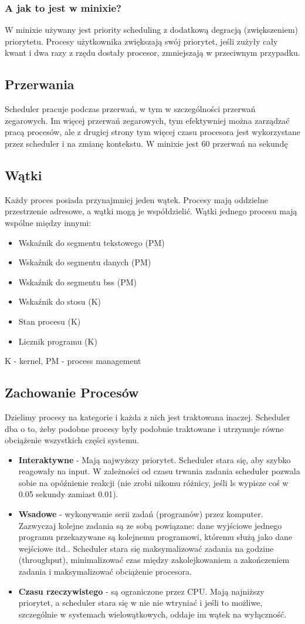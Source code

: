 \documentclass[12pt, a4paper, polish, openany]{book}
\begin{document}
\subsubsection{A jak to jest w minixie?}
W minixie używany jest priority scheduling z dodatkową degracją (zwiększeniem) priorytetu. Procesy użytkownika zwiększają swój priorytet, jeśli zużyły cały kwant i dwa razy z rzędu dostały procesor, zmniejszają w przeciwnym przypadku.
\subsection{Przerwania}
Scheduler pracuje podczas przerwań, w tym w szczególności przerwań zegarowych. Im więcej przerwań zegarowych, tym efektywniej można zarządzać pracą procesów, ale z drugiej strony tym więcej czasu procesora jest wykorzystane przez scheduler i na zmianę kontekstu. W minixie jest 60 przerwań na sekundę
\subsection{Wątki}
Każdy proces posiada przynajmniej jeden wątek. Procesy mają oddzielne przestrzenie adresowe, a wątki mogą je współdzielić. Wątki jednego procesu mają wspólne między innymi:
\begin{itemize}
  \item Wskaźnik do segmentu tekstowego (PM)
  \item Wskaźnik do segmentu danych (PM)
  \item Wskaźnik do segmentu bss (PM)
  \item Wskaźnik do stosu (K)
  \item Stan procesu (K)
  \item Licznik programu (K)
\end{itemize}
K - kernel, PM - process management
\subsection{Zachowanie Procesów}
Dzielimy procesy na kategorie i każda z nich jest traktowana inaczej. Scheduler dba o to, żeby podobne procesy były podobnie traktowane i utrzymuje równe obciążenie wszystkich części systemu.
\begin{itemize}
  \item \textbf{Interaktywne} - Mają najwyższy priorytet. Scheduler stara się, aby szybko reagowały na input. W zależności od czasu trwania zadania scheduler pozwala sobie na opóźnienie reakcji (nie zrobi nikomu różnicy, jeśli ls wypisze coś w 0.05 sekundy zamiast 0.01).
  \item \textbf{Wsadowe} - wykonywanie serii zadań (programów) przez komputer. Zazwyczaj kolejne zadania są ze sobą powiązane: dane wyjściowe jednego programu przekazywane są kolejnemu programowi, któremu służą jako dane wejściowe itd.. Scheduler stara się maksymalizować zadania na godzine (throughput), minimalizować czas między zakolejkowaniem a zakończeniem zadania i maksymalizować obciążenie procesora.
  \item \textbf{Czasu rzeczywistego} - są ograniczone przez CPU. Mają najniższy priorytet, a scheduler stara się w nie nie wtryniać i jeśli to możliwe, szczególnie w systemach wielowątkowych, oddaje im wątek na wyłączność.
\end{itemize}
\end{document}

